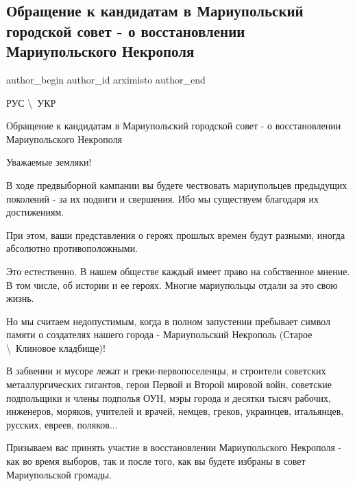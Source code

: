  
 
 
 
 

\subsection{Обращение к кандидатам в Мариупольский городской совет - о восстановлении Мариупольского Некрополя}
\label{sec:20_09_2020.fb.arximisto.1.obraschenie_kandidaty_mar_gorsovet_vosstanovlenie_nekropol}

\ifcmt
 author_begin
   author_id arximisto
 author_end
\fi

РУС \textbackslash\ УКР

Обращение к кандидатам в Мариупольский городской совет - о восстановлении
Мариупольского Некрополя

Уважаемые земляки!

В ходе предвыборной кампании вы будете чествовать мариупольцев предыдущих
поколений - за их подвиги и свершения. Ибо мы существуем благодаря их
достижениям. 

При этом, ваши представления о героях прошлых времен будут разными, иногда
абсолютно противоположными.  

Это естественно. В нашем обществе каждый имеет право на собственное мнение. В
том числе, об истории и ее героях. Многие мариупольцы отдали за это свою жизнь.

Но мы считаем недопустимым, когда в полном запустении пребывает символ памяти о
создателях нашего города - Мариупольский Некрополь (Старое \textbackslash\ Клиновое
кладбище)! 

В забвении и мусоре лежат и греки-первопоселенцы, и строители советских
металлургических гигантов, герои Первой и Второй мировой войн, советские
подпольщики и члены подполья ОУН, мэры города и десятки тысяч рабочих,
инженеров, моряков, учителей и врачей, немцев, греков, украинцев, итальянцев,
русских, евреев, поляков...

Призываем вас принять участие в восстановлении Мариупольского Некрополя - как
во время выборов, так и после того, как вы будете избраны в совет Мариупольской
громады.

